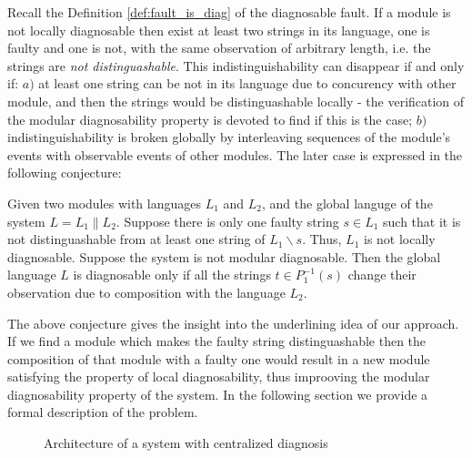 \documentclass[a4paper, 10pt, conference]{ieeeconf}
\begin{document}
Recall the Definition \ref{def:fault_is_diag} of the diagnosable fault. If a
module is not locally diagnosable then exist at least two strings in its
language, one is faulty and one is not, with the same observation of arbitrary
length, i.e. the strings are \emph{not distinguashable}. This
indistinguishability can disappear if and only if:
$a)$ at least one string can be not in its language due to concurency with other
module, and then the strings would be distinguashable locally - the verification
of the modular diagnosability property is devoted to find if this is the case;
$b)$ indistinguishability is broken globally by interleaving sequences of the
module's events with observable events of other modules. The later case is
expressed in the following conjecture:
\begin{conjecture} Given two modules with languages $L_1$ and $L_2$, and the
global languge of the system $L = L_1 \parallel L_2$. Suppose there is only one
faulty string $s \in L_1$ such that it is not distinguashable from at least one
string of $L_1\backslash s$. Thus, $L_1$ is not locally diagnosable. Suppose the
system is not modular diagnosable. Then the global language $L$ is diagnosable
only if all the strings $t \in P_1^{-1}(s)$ change their observation due to 
composition with the language $L_2$.
\end{conjecture}

The above conjecture gives the insight into the underlining idea of our
approach. If we find a module which makes the faulty string distinguashable
then the composition of that module with a faulty one would result in a new
module satisfying the property of local diagnosability, thus improoving
the modular diagnosability property of the system. In the following section we
provide a formal description of the problem.



\begin{figure}[t]
\centering
{}
\caption{Architecture of a system with centralized diagnosis}
\label{fig_centralized}
\end{figure}
\end{document}

